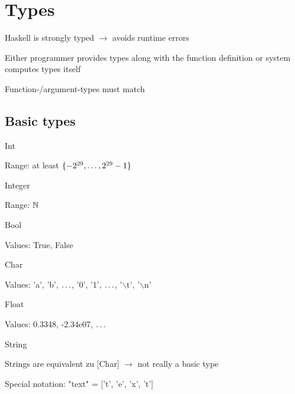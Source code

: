 \section{Types}
\enumstart
	\item Haskell is strongly typed $\rightarrow$ avoids runtime errors
	\item Either programmer provides types along with the function definition or system computes types itself
	\item Function-/argument-types must match
\enumend

\subsection{Basic types}
\enumstart
	\item Int
	\enumstart
		\item Range: at least $\{-2^{29}, \mathellipsis, 2^{29}-1\}$
	\enumend
	\item Integer
	\enumstart
		\item Range: $\mathbb{N}$
	\enumend
	\item Bool
	\enumstart
		\item Values: True, False
	\enumend
	\item Char
	\enumstart
		\item Values: 'a', 'b', $\mathellipsis$, '0', '1', $\mathellipsis$, '$\backslash$t', '$\backslash$n'
	\enumend
	\item Float
	\enumstart
		\item Values: 0.3348, -2.34e07, $\mathellipsis$
	\enumend
	\item String
	\enumstart
		\item Strings are equivalent zu [Char] $\rightarrow$ not really a basic type
		\item Special notation: "text" = ['t', 'e', 'x', 't']
	\enumend
\enumend

